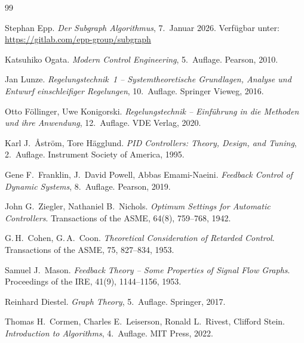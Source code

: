 \documentclass[a4paper,12pt]{article}
\theoremstyle{definition}
\begin{document}
\begin{thebibliography}{99}

Stephan Epp.
\textit{Der Subgraph Algorithmus}, 7.\ Januar 2026.
Verfügbar unter: \url{https://gitlab.com/epp-group/subgraph}

Katsuhiko Ogata.
\textit{Modern Control Engineering}, 5.\ Auflage.
Pearson, 2010.

Jan Lunze.
\textit{Regelungstechnik~1 -- Systemtheoretische Grundlagen, Analyse und Entwurf
einschleifiger Regelungen}, 10.\ Auflage.
Springer Vieweg, 2016.

Otto Föllinger, Uwe Konigorski.
\textit{Regelungstechnik -- Einführung in die Methoden und ihre Anwendung},
12.\ Auflage.
VDE Verlag, 2020.

Karl J.\ Åström, Tore Hägglund.
\textit{PID Controllers: Theory, Design, and Tuning}, 2.\ Auflage.
Instrument Society of America, 1995.

Gene F.\ Franklin, J.\ David Powell, Abbas Emami-Naeini.
\textit{Feedback Control of Dynamic Systems}, 8.\ Auflage.
Pearson, 2019.

John G.\ Ziegler, Nathaniel B.\ Nichols.
\textit{Optimum Settings for Automatic Controllers}.
Transactions of the ASME, 64(8), 759--768, 1942.

G.\,H.\ Cohen, G.\,A.\ Coon.
\textit{Theoretical Consideration of Retarded Control}.
Transactions of the ASME, 75, 827--834, 1953.

Samuel J.\ Mason.
\textit{Feedback Theory -- Some Properties of Signal Flow Graphs}.
Proceedings of the IRE, 41(9), 1144--1156, 1953.

Reinhard Diestel.
\textit{Graph Theory}, 5.\ Auflage.
Springer, 2017.

Thomas H.\ Cormen, Charles E.\ Leiserson, Ronald L.\ Rivest, Clifford Stein.
\textit{Introduction to Algorithms}, 4.\ Auflage.
MIT Press, 2022.


\end{thebibliography}
\end{document}
